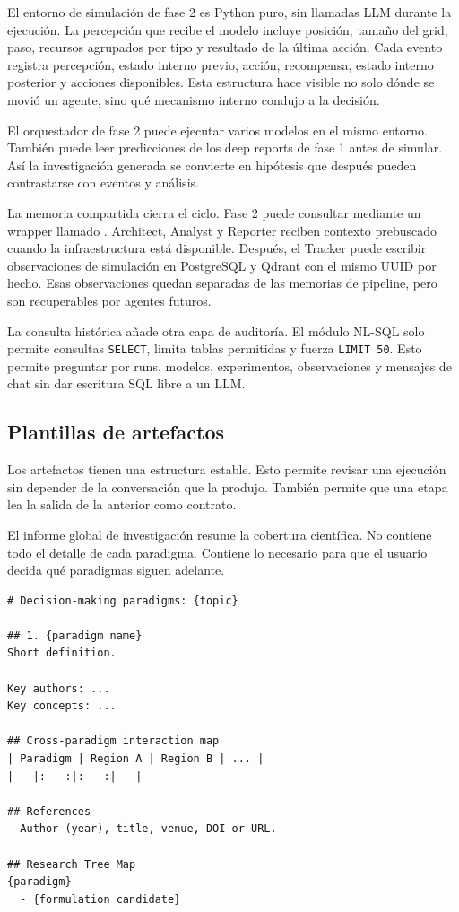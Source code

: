 El entorno de simulación de fase 2 es Python puro, sin llamadas LLM durante la
ejecución. La percepción que recibe el modelo incluye posición, tamaño del
grid, paso, recursos agrupados por tipo y resultado de la última acción. Cada
evento registra percepción, estado interno previo, acción, recompensa, estado
interno posterior y acciones disponibles. Esta estructura hace visible no solo
dónde se movió un agente, sino qué mecanismo interno condujo a la decisión.

El orquestador de fase 2 puede ejecutar varios modelos en el mismo entorno.
También puede leer predicciones de los deep reports de fase 1 antes de simular.
Así la investigación generada se convierte en hipótesis que después pueden
contrastarse con eventos y análisis.

La memoria compartida cierra el ciclo. Fase 2 puede consultar
 mediante un wrapper llamado
. Architect, Analyst y Reporter reciben contexto
prebuscado cuando la infraestructura está disponible. Después, el Tracker puede
escribir observaciones de simulación en PostgreSQL y Qdrant con el mismo UUID
por hecho. Esas observaciones quedan separadas de las memorias de pipeline,
pero son recuperables por agentes futuros.

La consulta histórica añade otra capa de auditoría. El módulo NL-SQL solo
permite consultas \texttt{SELECT}, limita tablas permitidas y fuerza
\texttt{LIMIT 50}. Esto permite preguntar por runs, modelos, experimentos,
observaciones y mensajes de chat sin dar escritura SQL libre a un LLM.

\subsection{Plantillas de artefactos}

Los artefactos tienen una estructura estable. Esto permite revisar una
ejecución sin depender de la conversación que la produjo. También permite que
una etapa lea la salida de la anterior como contrato.

El informe global de investigación resume la cobertura científica. No contiene
todo el detalle de cada paradigma. Contiene lo necesario para que el usuario
decida qué paradigmas siguen adelante.

\begin{lstlisting}
# Decision-making paradigms: {topic}

## 1. {paradigm name}
Short definition.

Key authors: ...
Key concepts: ...

## Cross-paradigm interaction map
| Paradigm | Region A | Region B | ... |
|---|:---:|:---:|---|

## References
- Author (year), title, venue, DOI or URL.

## Research Tree Map
{paradigm}
  - {formulation candidate}
\end{lstlisting}

